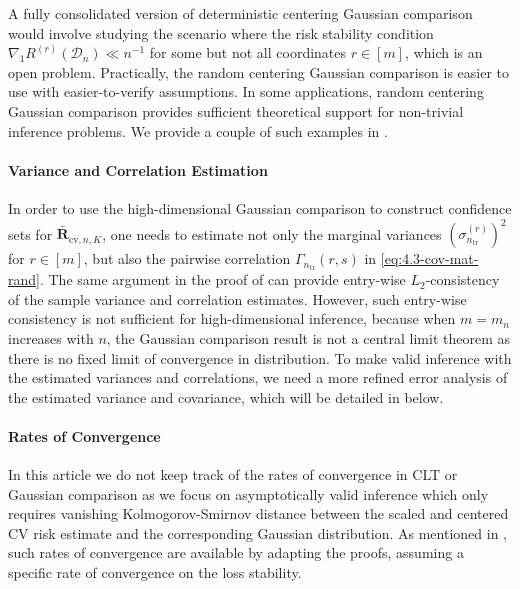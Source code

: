 \documentclass[11pt]{article}
\theoremstyle{plain}
\newcommand{\cv}{{\mathrm{cv}}}
\newcommand{\tr}{{\mathrm{tr}}}
\newcommand{\D}{{\mathcal{D}}}
\begin{document}
A fully consolidated version of deterministic centering Gaussian comparison would involve studying the scenario where the risk stability condition $\nabla_1 R^{(r)}(\D_n)\ll n^{-1}$ for some but not all coordinates $r\in[m]$, which is an open problem. Practically, the random centering Gaussian comparison is easier to use with easier-to-verify assumptions. In some applications, random centering Gaussian comparison provides sufficient theoretical support for non-trivial inference problems. We provide a couple of such examples in .

\paragraph{Variance and Correlation Estimation} In order to use the high-dimensional Gaussian comparison  to construct confidence sets for $\bar{\mathbf R}_{\cv,n,K}$, one needs to estimate not only the marginal variances $(\sigma_{n_\tr}^{(r)})^2$ for $r\in[m]$, but also the pairwise correlation $\Gamma_{n_\tr}(r,s)$ in \eqref{eq:4.3-cov-mat-rand}. The same argument in the proof of  can provide entry-wise $L_2$-consistency of the sample variance and correlation estimates. However, such entry-wise consistency is not sufficient for high-dimensional inference, because when $m=m_n$ increases with $n$, the Gaussian comparison result is not a central limit theorem as there is no fixed limit of convergence in distribution.  To make valid inference with the estimated variances and correlations, we need a more refined error analysis of the estimated variance and covariance, which will be detailed in  below.

\paragraph{Rates of Convergence} In this article we do not keep track of the rates of convergence in CLT or Gaussian comparison as we focus on asymptotically valid inference which only requires vanishing Kolmogorov-Smirnov distance between the scaled and centered CV risk estimate and the corresponding Gaussian distribution.  As mentioned in , such rates of convergence are available by adapting the proofs, assuming a specific rate of convergence on the loss stability.

\end{document}
